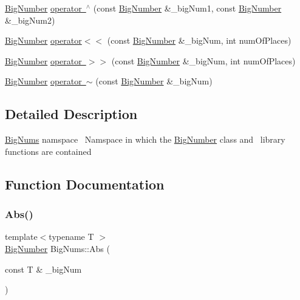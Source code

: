 \begin{DoxyCompactItemize}
\item 
\mbox{\hyperlink{class_big_nums_1_1_big_number}{Big\+Number}} \mbox{\hyperlink{namespace_big_nums_a991aa6b41e534b73bab66446db5909b7}{operator $^\wedge$}} (const \mbox{\hyperlink{class_big_nums_1_1_big_number}{Big\+Number}} \&\+\_\+big\+Num1, const \mbox{\hyperlink{class_big_nums_1_1_big_number}{Big\+Number}} \&\+\_\+big\+Num2)
\item 
\mbox{\hyperlink{class_big_nums_1_1_big_number}{Big\+Number}} \mbox{\hyperlink{namespace_big_nums_a7fae187d94a5f4c3869ca24f68826cef}{operator$<$$<$}} (const \mbox{\hyperlink{class_big_nums_1_1_big_number}{Big\+Number}} \&\+\_\+big\+Num, int num\+Of\+Places)
\item 
\mbox{\hyperlink{class_big_nums_1_1_big_number}{Big\+Number}} \mbox{\hyperlink{namespace_big_nums_a461540d97b6da48dc4f771ab6c41a5f9}{operator $>$$>$}} (const \mbox{\hyperlink{class_big_nums_1_1_big_number}{Big\+Number}} \&\+\_\+big\+Num, int num\+Of\+Places)
\item 
\mbox{\hyperlink{class_big_nums_1_1_big_number}{Big\+Number}} \mbox{\hyperlink{namespace_big_nums_a9bdd811316d31ba358ef97ee09cbb011}{operator $\sim$}} (const \mbox{\hyperlink{class_big_nums_1_1_big_number}{Big\+Number}} \&\+\_\+big\+Num)
\end{DoxyCompactItemize}


\subsection{Detailed Description}
\mbox{\hyperlink{namespace_big_nums}{Big\+Nums}} namspace~\newline
Namspace in which the \mbox{\hyperlink{class_big_nums_1_1_big_number}{Big\+Number}} class and~\newline
library functions are contained 

\subsection{Function Documentation}
\mbox{\label{namespace_big_nums_a18e6e5d50d69125d22b2d4510354de2e}} 
\subsubsection{\texorpdfstring{Abs()}{Abs()}}
{\footnotesize\ttfamily template$<$typename T $>$ \\
\mbox{\hyperlink{class_big_nums_1_1_big_number}{Big\+Number}} Big\+Nums\+::\+Abs (\begin{DoxyParamCaption}\item[{const T \&}]{\+\_\+big\+Num }\end{DoxyParamCaption})}

